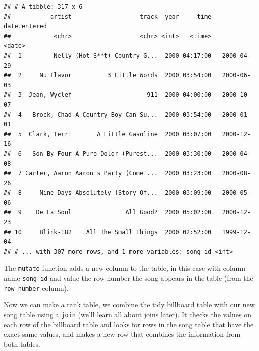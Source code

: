 \documentclass[]{book}
\newenvironment{Shaded}{\begin{snugshade}}{\end{snugshade}}
\newcommand{\KeywordTok}[1]{\textcolor[rgb]{0.13,0.29,0.53}{\textbf{#1}}}
\newcommand{\StringTok}[1]{\textcolor[rgb]{0.31,0.60,0.02}{#1}}
\newcommand{\OperatorTok}[1]{\textcolor[rgb]{0.81,0.36,0.00}{\textbf{#1}}}
\newcommand{\NormalTok}[1]{#1}
\theoremstyle{definition}
\theoremstyle{definition}
\theoremstyle{remark}
\begin{document}
\begin{verbatim}
## # A tibble: 317 x 6
##           artist                   track  year     time date.entered
##            <chr>                   <chr> <int>   <time>       <date>
##  1         Nelly (Hot S**t) Country G...  2000 04:17:00   2000-04-29
##  2     Nu Flavor          3 Little Words  2000 03:54:00   2000-06-03
##  3  Jean, Wyclef                     911  2000 04:00:00   2000-10-07
##  4   Brock, Chad A Country Boy Can Su...  2000 03:54:00   2000-01-01
##  5  Clark, Terri       A Little Gasoline  2000 03:07:00   2000-12-16
##  6   Son By Four A Puro Dolor (Purest...  2000 03:30:00   2000-04-08
##  7 Carter, Aaron Aaron's Party (Come ...  2000 03:23:00   2000-08-26
##  8     Nine Days Absolutely (Story Of...  2000 03:09:00   2000-05-06
##  9    De La Soul               All Good?  2000 05:02:00   2000-12-23
## 10     Blink-182    All The Small Things  2000 02:52:00   1999-12-04
## # ... with 307 more rows, and 1 more variables: song_id <int>
\end{verbatim}

The \texttt{mutate} function adds a new column to the table, in this
case with column name \texttt{song\_id} and value the row number the
song appears in the table (from the \texttt{row\_number} column).

Now we can make a rank table, we combine the tidy billboard table with
our new song table using a \texttt{join} (we'll learn all about joins
later). It checks the values on each row of the billboard table and
looks for rows in the song table that have the exact same values, and
makes a new row that combines the information from both tables.

\begin{Shaded}
\end{Shaded}
\end{document}
